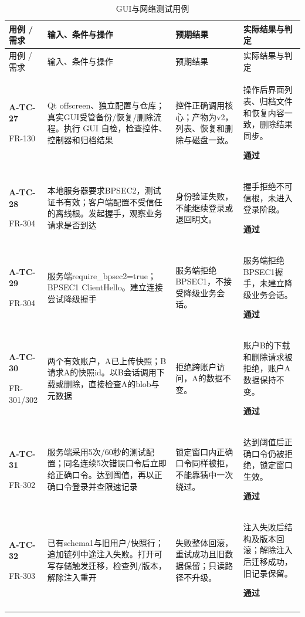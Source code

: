 \begin{longtable}{@{}L{.14\linewidth}L{.36\linewidth}L{.21\linewidth}L{.23\linewidth}@{}}
\caption{GUI与网络测试用例}\label{tab:test-5}\\
\toprule 用例 / 需求 & 输入、条件与操作 & 预期结果 & 实际结果与判定\\\midrule\endfirsthead
\toprule 用例 / 需求 & 输入、条件与操作 & 预期结果 & 实际结果与判定\\\midrule\endhead
\bottomrule\endfoot
\textbf{A-TC-27}\par{\footnotesize FR-130} & Qt offscreen、独立配置与仓库；真实GUI受管备份/恢复/删除流程。执行 GUI 自检，检查控件、控制器和归档结果 & 控件正确调用核心；产物为v2，列表、恢复和删除与磁盘一致。 & 操作后界面列表、归档文件和恢复内容一致，删除结果同步。\par\textbf{通过}\\\addlinespace[2pt]
\textbf{A-TC-28}\par{\footnotesize FR-304} & 本地服务器要求BPSEC2，测试证书有效；客户端配置不受信任的离线根。发起握手，观察业务请求是否到达 & 身份验证失败，不能继续登录或退回明文。 & 握手拒绝不可信根，未进入登录阶段。\par\textbf{通过}\\\addlinespace[2pt]
\textbf{A-TC-29}\par{\footnotesize FR-304} & 服务端require\_bpsec2=true；BPSEC1 ClientHello。建立连接尝试降级握手 & 服务端拒绝BPSEC1，不接受降级业务会话。 & 服务端拒绝BPSEC1握手，未建立降级业务会话。\par\textbf{通过}\\\addlinespace[2pt]
\textbf{A-TC-30}\par{\footnotesize FR-301/302} & 两个有效账户，A已上传快照；B请求A的快照id。以B会话调用下载或删除，直接检查A的blob与元数据 & 拒绝跨账户访问，A的数据不变。 & 账户B的下载和删除请求被拒绝，账户A数据保持不变。\par\textbf{通过}\\\addlinespace[2pt]
\textbf{A-TC-31}\par{\footnotesize FR-302} & 服务端采用5次/60秒的测试配置；同名连续5次错误口令后立即给正确口令。达到阈值，再以正确口令登录并查限速记录 & 锁定窗口内正确口令同样被拒，不能靠猜中一次绕过。 & 达到阈值后正确口令仍被拒绝，锁定窗口生效。\par\textbf{通过}\\\addlinespace[2pt]
\textbf{A-TC-32}\par{\footnotesize FR-303} & 已有schema1与旧用户/快照行；追加链列中途注入失败。打开可写存储触发迁移，检查列/版本，解除注入重开 & 失败整体回滚，重试成功且旧数据保留；只读路径不升级。 & 注入失败后结构及版本回滚；解除注入后迁移成功，旧记录保留。\par\textbf{通过}\\\addlinespace[2pt]
\end{longtable}

